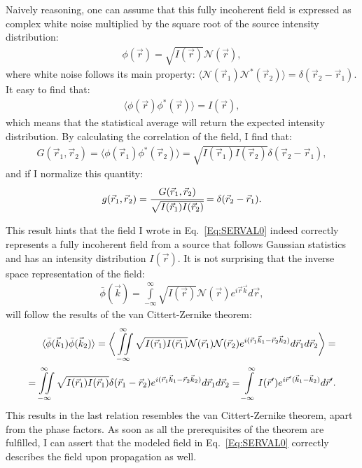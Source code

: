     Naively reasoning, one can assume that this fully incoherent field is expressed as complex white noise multiplied by the square root of the source intensity distribution:
    \begin{align}
        \phi(\vec{r}) = \sqrt{I(\vec{r})} \mathcal{N}(\vec{r}),
        \label{Eq:SERVAL0}
    \end{align}
    where white noise follows its main property: $\langle \mathcal{N}(\vec{r}_1)\mathcal{N}^*(\vec{r}_2)\rangle = \delta(\vec{r}_2 - \vec{r}_1)$. It easy to find that:
    \begin{align}
        \langle \phi(\vec{r})\phi^*(\vec{r}) \rangle = I(\vec{r}),
    \end{align}        
    which means that the statistical average will return the expected intensity distribution. By calculating the correlation of the field, I find that:
    \begin{align}
        G(\vec{r}_1, \vec{r}_2) = \langle \phi(\vec{r}_1)\phi^*(\vec{r}_2) \rangle = \sqrt{I(\vec{r}_1)I(\vec{r}_2)}  \delta(\vec{r}_2 - \vec{r}_1), 
    \end{align}          
    and if I normalize this quantity:
    \begin{align}
        g(\vec{r}_1, \vec{r}_2) = \cfrac{G(\vec{r}_1, \vec{r}_2)}{\sqrt{I(\vec{r}_1)I(\vec{r}_2)}} = \delta(\vec{r}_2 - \vec{r}_1). 
    \end{align}        
    
    This result hints that the field I wrote in Eq.~\ref{Eq:SERVAL0} indeed correctly represents a fully incoherent field from a source that follows Gaussian statistics and has an intensity distribution $I(\vec{r})$. It is not surprising that the inverse space representation of the field:
    \begin{align}
        \bar{\phi}(\vec{k}) = \int \limits_{-\infty}^{\infty} \sqrt{I(\vec{r})} \mathcal{N}(\vec{r}) e^{i \vec{r}\vec{k}}d\vec{r},
    \end{align}
    will follow the results of the van Cittert-Zernike theorem:
    \begin{align}
        \langle \bar{\phi}(\vec{k}_1) \bar{\phi}(\vec{k}_2) \rangle = \bigg \langle \iint \limits_{-\infty}^{\infty}  \sqrt{I(\vec{r}_1)I(\vec{r}_1)} \mathcal{N}(\vec{r}_1)\mathcal{N}(\vec{r}_2) e^{i (\vec{r}_1\vec{k}_1 - \vec{r}_2\vec{k}_2)}d\vec{r}_1d\vec{r}_2 \bigg \rangle = \cr
        =\iint \limits_{-\infty}^{\infty} \sqrt{I(\vec{r}_1)I(\vec{r}_1)} \delta(\vec{r}_1 - \vec{r}_2) e^{i (\vec{r}_1\vec{k}_1 - \vec{r}_2\vec{k}_2)}d\vec{r}_1d\vec{r}_2 = \int \limits_{-\infty}^{\infty} I(\vec{r}') e^{i \vec{r}'(\vec{k}_1 - \vec{k}_2)}d\vec{r}'.
    \end{align}
    This results in the last relation resembles the van Cittert-Zernike theorem, apart from the phase factors. As soon as all the prerequisites of the theorem are fulfilled, I can assert that the modeled field in Eq.~\ref{Eq:SERVAL0} correctly describes the field upon propagation as well.
    
